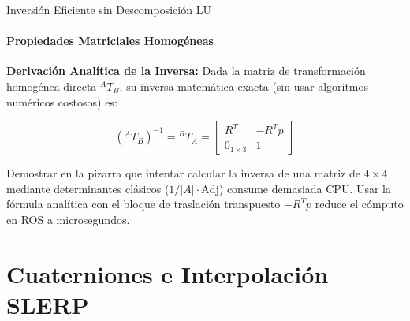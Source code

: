 \documentclass[aspectratio=169, 10pt]{beamer}
\begin{document}
\begin{frame}{Inversión Eficiente sin Descomposición LU}
    \framesubtitle{Propiedades Matriciales Homogéneas}
    
    \textbf{Derivación Analítica de la Inversa:}
    Dada la matriz de transformación homogénea directa $^{A}T_{B}$, su inversa matemática exacta (sin usar algoritmos numéricos costosos) es:
    
    \begin{equation*}
        ({}^{A}T_{B})^{-1} = {}^{B}T_{A} = 
        \begin{bmatrix} 
        R^T & -R^T p \\ 
        0_{1\times3} & 1 
        \end{bmatrix}
    \end{equation*}
    
    \vspace{0.5cm}
    \begin{notadocente}
        Demostrar en la pizarra que intentar calcular la inversa de una matriz de $4 \times 4$ mediante determinantes clásicos ($1/|A| \cdot \text{Adj}$) consume demasiada CPU. Usar la fórmula analítica con el bloque de traslación transpuesto $-R^T p$ reduce el cómputo en ROS a microsegundos.
    \end{notadocente}
\end{frame}

\section{Cuaterniones e Interpolación SLERP}
\end{document}
